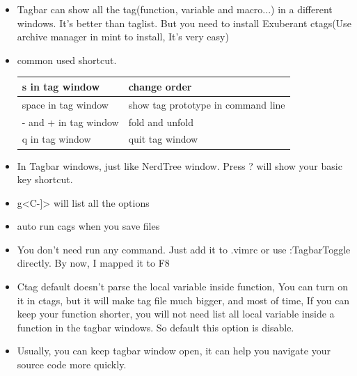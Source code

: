 \documentclass[a4paper,12pt,twoside]{book}
\begin{document}
\begin{itemize}



\item Tagbar can show all the tag(function, variable and macro...) in a different windows. It's better than taglist. But you need to install Exuberant ctags(Use archive manager in mint to install, It's very easy)

\item common used shortcut.	\\	
\begin{tabular}{|p{}|p{}|}
\hline 
s in tag window & change order \\ 

\hline 
space in tag window & show tag prototype in command line  \\ 

\hline 
- and + in tag window & fold and unfold \\ 

\hline 
q in tag window & quit tag window \\ 

\hline 
\end{tabular}
\item In Tagbar windows, just like NerdTree window. Press ? will show your basic key shortcut. 
		
\item g<C-]> will list all the options
		
\item auto run cags when you save files

\item You don't need run any command. Just add it to .vimrc or use :TagbarToggle directly. By now, I mapped it to F8

\item Ctag default doesn't parse the local variable inside function, You can turn on it in ctags, but it will make tag file much bigger, and most of time, If you can keep your function shorter, you will not need list all local variable inside a function in the tagbar windows. So default this option is disable. 

\item Usually, you can keep tagbar window open, it can help you navigate your source code more quickly. 
\end{itemize}
\end{document}
